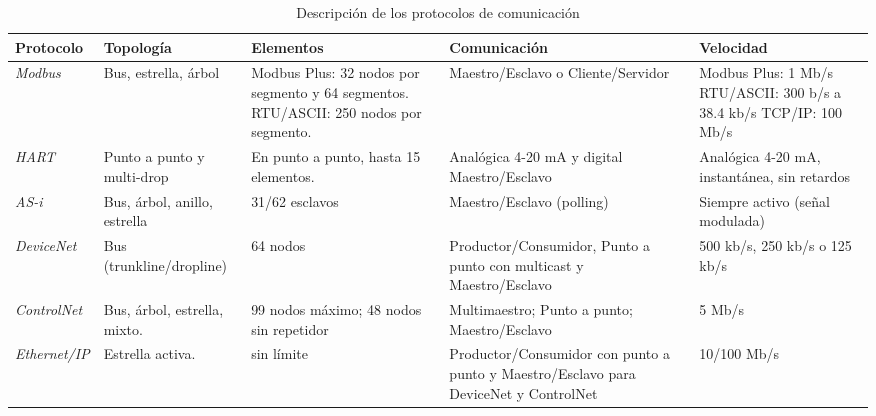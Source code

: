 \begin{table}[H]
	\centering
	\caption{Descripción de los protocolos de comunicación \cite{DC5}}
	\begin{tabular}{@{}|p{2cm}|p{2cm}|p{2.5cm}|p{4cm}|p{2.5cm}|}
		\hline
		\textbf{Protocolo} & \textbf{Topología} & \textbf{Elementos} & \textbf{Comunicación} & \textbf{Velocidad} \\
		\hline \hline
		\textit{Modbus} & Bus, estrella, árbol & Modbus Plus: 32 nodos por segmento y 64 segmentos.
		RTU/ASCII: 250 nodos por segmento. & Maestro/Esclavo o Cliente/Servidor & Modbus Plus: 1 Mb/s
		RTU/ASCII: 300 b/s a 38.4 kb/s
		TCP/IP: 100 Mb/s
		\\ \hline
		\textit{HART} & Punto a punto y multi-drop & En punto a punto, hasta 15 elementos. & Analógica 4-20 mA y digital Maestro/Esclavo & Analógica 4-20 mA, instantánea, sin retardos
		\\ \hline
		\textit{AS-i} & Bus, árbol, anillo, estrella & 31/62 esclavos & Maestro/Esclavo (polling) & Siempre activo (señal modulada)
		\\ \hline
		\textit{DeviceNet} & Bus (trunkline/dropline) & 64 nodos & Productor/Consumidor, Punto a punto con multicast y Maestro/Esclavo & 500 kb/s, 250 kb/s o 125 kb/s
		\\ \hline
		\textit{ControlNet} & Bus, árbol, estrella, mixto. & 99 nodos máximo; 48 nodos sin repetidor & Multimaestro; Punto a punto; Maestro/Esclavo & 5 Mb/s
		\\ \hline
		\textit{Ethernet/IP} & Estrella activa. & sin límite & Productor/Consumidor con punto a punto y Maestro/Esclavo para DeviceNet y ControlNet & 10/100 Mb/s
		\\ \hline
	\end{tabular}		
	\label{tabla:protocolos}
\end{table}

